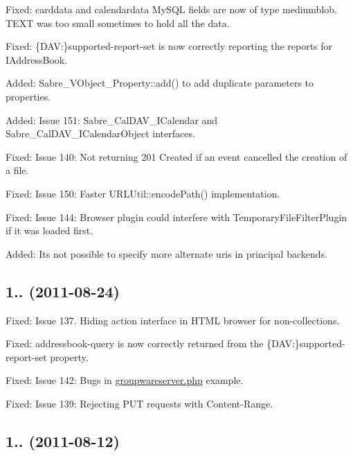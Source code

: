 \begin{DoxyItemize}
\item Fixed\+: carddata and calendardata My\+S\+QL fields are now of type \textquotesingle{}mediumblob\textquotesingle{}. \textquotesingle{}T\+E\+XT\textquotesingle{} was too small sometimes to hold all the data.
\item Fixed\+: \{D\+AV\+:\}supported-\/report-\/set is now correctly reporting the reports for I\+Address\+Book.
\item Added\+: Sabre\+\_\+\+V\+Object\+\_\+\+Property\+::add() to add duplicate parameters to properties.
\item Added\+: Issue 151\+: Sabre\+\_\+\+Cal\+D\+A\+V\+\_\+\+I\+Calendar and Sabre\+\_\+\+Cal\+D\+A\+V\+\_\+\+I\+Calendar\+Object interfaces.
\item Fixed\+: Issue 140\+: Not returning 201 Created if an event cancelled the creation of a file.
\item Fixed\+: Issue 150\+: Faster U\+R\+L\+Util\+::encode\+Path() implementation.
\item Fixed\+: Issue 144\+: Browser plugin could interfere with Temporary\+File\+Filter\+Plugin if it was loaded first.
\item Added\+: It\textquotesingle{}s not possible to specify more \textquotesingle{}alternate uris\textquotesingle{} in principal backends.
\end{DoxyItemize}

\subsection*{1.. (2011-\/08-\/24) }


\begin{DoxyItemize}
\item Fixed\+: Issue 137. Hiding action interface in H\+T\+ML browser for non-\/collections.
\item Fixed\+: addressbook-\/query is now correctly returned from the \{D\+AV\+:\}supported-\/report-\/set property.
\item Fixed\+: Issue 142\+: Bugs in \mbox{\hyperlink{groupwareserver_8php_source}{groupwareserver.\+php}} example.
\item Fixed\+: Issue 139\+: Rejecting P\+UT requests with Content-\/\+Range.
\end{DoxyItemize}

\subsection*{1.. (2011-\/08-\/12) }


